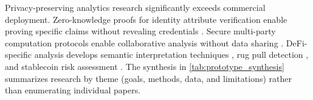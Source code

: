 \documentclass[conference,compsoc]{IEEEtran}
\begin{document}
Privacy-preserving analytics research significantly exceeds commercial deployment. Zero-knowledge proofs for identity attribute verification enable proving specific claims without revealing credentials \cite{yang2024researchidentitydata,zhang2024blockchainzeroknowledge,ben-sasson2017scalablezeroknowledge}. Secure multi-party computation protocols enable collaborative analysis without data sharing \cite{bansod2022challengesmakingblockchain}. DeFi-specific analysis develops semantic interpretation techniques \cite{chen2020understandingethereumgraph,sun2025ethereumfrauddetection}, rug pull detection \cite{sun2024sokcomprehensiveanalysis}, and stablecoin risk assessment \cite{ling2025sokstablecoindesigns,financialactiontaskforcefatf2020reportg20socalled}. The synthesis in \autoref{tab:prototype_synthesis} summarizes research by theme (goals, methods, data, and limitations) rather than enumerating individual papers.
\end{document}

